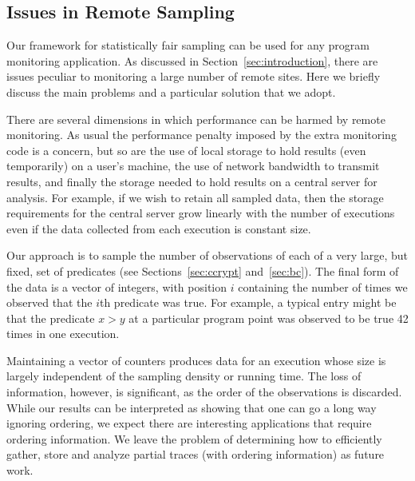 \subsection{Issues in Remote Sampling}
\label{sec:compression}

Our framework for statistically fair sampling can be used for any
program monitoring application.  As discussed in
Section~\ref{sec:introduction}, there are issues peculiar to
monitoring a large number of remote sites.  Here we briefly discuss
the main problems and a particular solution that we adopt.

There are several dimensions in which performance can be harmed by
remote monitoring.  As usual the performance penalty imposed by the
extra monitoring code is a concern, but so are the use of local
storage to hold results (even temporarily) on a user's machine, the
use of network bandwidth to transmit results, and finally the storage
needed to hold results on a central server for analysis.  For example,
if we wish to retain all sampled data, then the storage requirements for the
central server grow linearly with the number of executions even if the
data collected from each execution is constant size.  

Our approach is to sample the number of observations of each of a very
large, but fixed, set of predicates (see Sections~\ref{sec:ccrypt}
and~\ref{sec:bc}).  The final form of the data is a vector of
integers, with position $i$ containing the number of times we observed
that the $i$th predicate was true.  For example, a typical entry might
be that the predicate $x > y$ at a particular program point was
observed to be true 42 times in one execution.

Maintaining a vector of counters produces data for an execution whose
size is largely independent of the sampling density or running time.
The loss of information, however, is significant, as the order
of the observations is discarded.  While our results can be interpreted
as showing that one can go a long way ignoring ordering, we expect
there are interesting applications that require ordering information.
We leave the problem of determining how to efficiently gather, store and
analyze partial traces (with ordering information) as future work.

